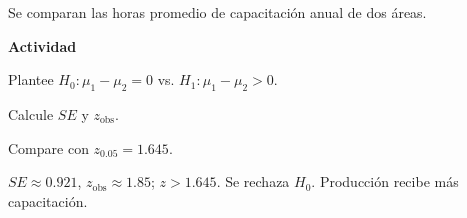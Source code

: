 \begin{ejercicio}
Se comparan las horas promedio de capacitación anual de dos áreas.


\textbf{Actividad}
\begin{pasos}
  \item Plantee $H_0:\mu_1-\mu_2=0$ vs. $H_1:\mu_1-\mu_2>0$.
  \item Calcule $SE$ y $z_{\text{obs}}$.
  \item Compare con $z_{0.05}=1.645$.
\end{pasos}

\begin{clave}
$SE\approx 0.921$, $z_{\text{obs}}\approx 1.85$; $z>1.645$.
Se rechaza $H_0$. Producción recibe más capacitación.
\end{clave}
\end{ejercicio}